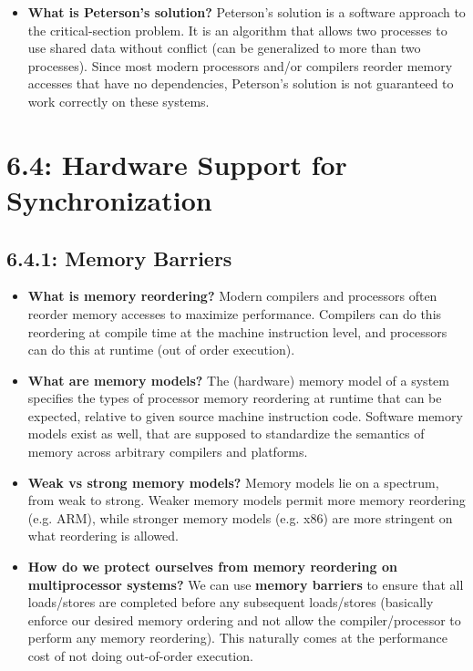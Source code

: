 \documentclass[12pt]{article}
\begin{document}
\begin{itemize}
    \item \textbf{What is Peterson's solution?} Peterson's solution is a software approach to the critical-section problem. It is an algorithm that allows two processes to use shared data without conflict (can be generalized to more than two processes). Since most modern processors and/or compilers reorder memory accesses that have no dependencies, Peterson's solution is not guaranteed to work correctly on these systems.
\end{itemize}

\section*{6.4: Hardware Support for Synchronization}

\subsection*{6.4.1: Memory Barriers}

\begin{itemize}
    \item \textbf{What is memory reordering?} Modern compilers and processors often reorder memory accesses to maximize performance. Compilers can do this reordering at compile time at the machine instruction level, and processors can do this at runtime (out of order execution).
    \item \textbf{What are memory models?} The (hardware) memory model of a system specifies the types of processor memory reordering at runtime that can be expected, relative to given source machine instruction code. Software memory models exist as well, that are supposed to standardize the semantics of memory across arbitrary compilers and platforms.
    \item \textbf{Weak vs strong memory models?} Memory models lie on a spectrum, from weak to strong. Weaker memory models permit more memory reordering (e.g. ARM), while stronger memory models (e.g. x86) are more stringent on what reordering is allowed.
    \item \textbf{How do we protect ourselves from memory reordering on multiprocessor systems?} We can use \textbf{memory barriers} to ensure that all loads/stores are completed before any subsequent loads/stores (basically enforce our desired memory ordering and not allow the compiler/processor to perform any memory reordering). This naturally comes at the performance cost of not doing out-of-order execution.
\end{itemize}
\end{document}
